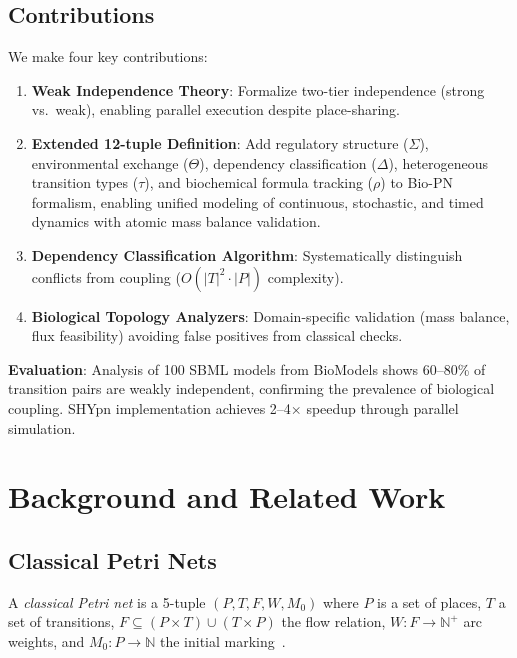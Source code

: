 \documentclass{article}
\begin{document}
\subsection{Contributions}

We make four key contributions:

\begin{enumerate}
    \item \textbf{Weak Independence Theory}: Formalize two-tier independence (strong vs.\ weak), enabling parallel execution despite place-sharing.
    
    \item \textbf{Extended 12-tuple Definition}: Add regulatory structure ($\Sigma$), environmental exchange ($\Theta$), dependency classification ($\Delta$), heterogeneous transition types ($\tau$), and biochemical formula tracking ($\rho$) to Bio-PN formalism, enabling unified modeling of continuous, stochastic, and timed dynamics with atomic mass balance validation.
    
    \item \textbf{Dependency Classification Algorithm}: Systematically distinguish conflicts from coupling ($O(|T|^2 \cdot |P|)$ complexity).
    
    \item \textbf{Biological Topology Analyzers}: Domain-specific validation (mass balance, flux feasibility) avoiding false positives from classical checks.
\end{enumerate}

\textbf{Evaluation}: Analysis of 100 SBML models from BioModels shows 60--80\% of transition pairs are weakly independent, confirming the prevalence of biological coupling. SHYpn implementation achieves 2--4$\times$ speedup through parallel simulation.

\section{Background and Related Work}

\subsection{Classical Petri Nets}

A \emph{classical Petri net} is a 5-tuple $(P, T, F, W, M_0)$ where $P$ is a set of places, $T$ a set of transitions, $F \subseteq (P \times T) \cup (T \times P)$ the flow relation, $W: F \to \mathbb{N}^+$ arc weights, and $M_0: P \to \mathbb{N}$ the initial marking~\cite{Murata1989}.
\end{document}

